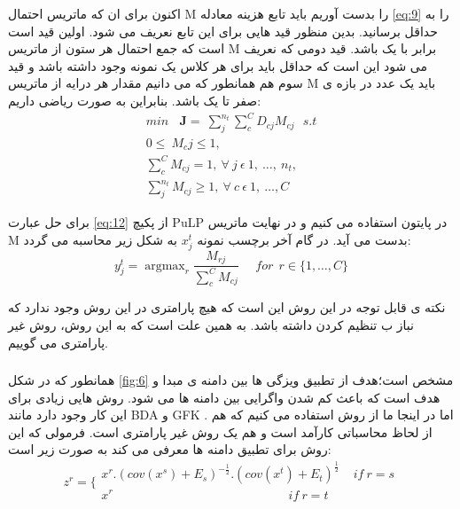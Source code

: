 {{{			اکنون برای ان که ماتریس احتمال M را بدست آوریم باید تابع هزینه معادله
			\ref{eq:9}
			را به حداقل برسانید. بدین منظور قید هایی برای این تابع نعریف می شود. اولین قید است است که جمع احتمال هر ستون از ماتریس M برابر با یک باشد. قید دومی که نعریف می شود این است که حداقل باید برای هر کلاس یک نمونه وجود داشته باشد و قید سوم هم همانطور که می دانیم مقدار هر درایه از ماتریس M باید یک عدد در بازه ی صفر تا یک باشد. بنابراین به صورت ریاضی داریم:
			\begin{equation}
			\begin{aligned}
			min\ \ \ \ \mathbf{J}=\ \sum_{j}^{n_t}\sum_{c}^{C}{D_{cj}}M_{cj} \ \ \ s.t \\
			0\le\ M_cj\le1,\ \ \ \ \ \ \ \ \ \ \ \ \ \ \ \ \ \ \ \ \ \ \ \ \ \ \ \  \\ 
			\sum_{c}^{C}M_{cj}=1,\ \forall\ j\ \epsilon\ 1,\ \ldots,\ n_t, \ \ \ \  \\ 
			\sum_{j}^{n_t}M_{cj}\geq1,\ \forall\ c\ \epsilon\ 1,\ \ldots,C  \ \ \ \ \ \ 
			\end{aligned}
			\label{eq:12}
			\end{equation}
			
			برای حل عبارت 
			\ref{eq:12}
			از پکیچ PuLP در پایتون استفاده می کنیم و در نهایت ماتریس M بدست می آید. در گام آخر برچسب نمونه
			$x_j^t$
			به شکل زیر محاسبه می گردد:
			\begin{equation}
			y_{j}^{t}=\mathop{argmax}_{r}\frac{M_{rj}}{ \sum _{c}^{C}M_{cj}}\ \ \ \ \ \ for \ \ r \in  \{ 1,  \ldots , C \}
			\label{eq:13}
			\end{equation}
			
			نکته ی قابل توجه در این روش این است که هیچ پارامتری در این روش وجود ندارد که نباز ب تنظیم کردن داشته باشد. به همین علت است که به این روش، روش غیر پارامتری می گوییم.
		}
		
		\subsubsection{}
		{
			همانطور که در شکل 
			\ref{fig:6}
			مشخص است؛هدف از 
			تطبیق ویزگی ها بین دامنه ی مبدا و هدف است که باعث کم شدن واگرایی بین دامنه ها می شود. روش هایی زیادی برای این کار وجود دارد مانند BDA‌ و GFK . اما در اینجا ما از روش 
			\lr{\textit{CORrelation ALignment}}
			استفاده می کنیم که هم از لحاظ محاسباتی کارآمد است و هم یک روش غیر پارامتری است. فرمولی که این روش برای تطبیق دامنه ها معرفی می کند به صورت زیر است:
			\begin{equation}
				z^{r}= \bigg\{ \begin{array}{c}
				x^{r}.  \left( cov \left( x^{s} \right) +E_{s} \right) ^{-\frac{1}{2}}. \left( cov \left( x^{t} \right) +E_{t} \right) ^{\frac{1}{2}}\ \ \ \ \ if \ r=s\\
				x^{r} \ \ \ \ \ \ \ \ \ \ \ \ \ \ \ \ \ \ \ \ \ \ \ \ \ \ \ \ \ \ \ \ \ \ \ \ \ \ \ \ \ \ \ \ \ \ \ \ \ \ \ \ \ \ \ \ \ \ \ \ \ \ \ \   if \ r=t\\
				\end{array}
				\label{eq:14}
			\end{equation}
			
}}}
